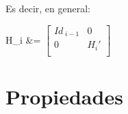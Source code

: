 \documentclass[12pt, fleqn]{report}                             %
\def \Eq {equation}                                             %
\newenvironment{MultiLineEquation*}[1]                          %
        {\begin{\Eq*}\begin{alignedat}{#1}}                         %
        {\end{alignedat}\end{\Eq*}}                                 %
\theoremstyle{break}                                            %
\newcommand{\bVector}[1]                                        %
        { \ensuremath{\begin{bmatrix}#1\end{bmatrix}} }             %
\begin{document}
            Es decir, en general:
            \begin{MultiLineEquation*}{3}
                H_i 
                    &= \bVector{
                        Id_{\; i - 1} & 0 \\
                        0 & H_i' \\
                    }
            \end{MultiLineEquation*}
            

        \clearpage
        \section{Propiedades}
\end{document}
